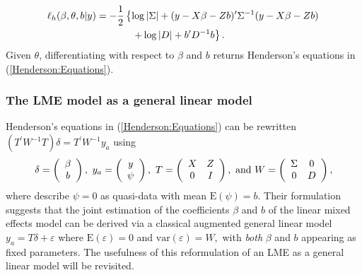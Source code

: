 \documentclass[12pt, a4paper]{report}
\theoremstyle{definition}
\theoremstyle{remark}
\begin{document}
\begin{eqnarray*}
\ell_h(\beta,\theta,b|y)
& = \displaystyle -\frac{1}{2} \left\{ \log|\Sigma| + (y - X \beta -Zb)'\Sigma^{-1}( y - X \beta -Zb) \right.\\
&  \hspace{0.5in} \left. + \log|D| + b^\prime D^{-1}b \right\}.
\end{eqnarray*}
Given $\theta$, differentiating with respect to $\beta$ and $b$ returns Henderson's equations in (\ref{Henderson:Equations}).

\subsubsection{The LME model as a general linear model}
Henderson's equations in (\ref{Henderson:Equations}) can be rewritten $( T^\prime W^{-1} T ) \delta = T^\prime W^{-1} y_{a} $ using
\[
\delta = \left(\begin{array}{c}\beta \\ b \end{array}\right),
\ y_{a} = \left(\begin{array}{c}
y \cr \psi
\end{array}\right),
\ T = \left(\begin{array}{cc}
X & Z  \\
0 & I
\end{array}\right),
\ \textrm{and} \ W = \left(\begin{array}{cc}
\Sigma & 0  \cr
0 &  D \end{array}\right),
\]
where \cite{YLee} describe $\psi = 0$ as quasi-data with mean $\mathrm{E}(\psi) = b.$ Their formulation suggests that the joint estimation of the coefficients $\beta$ and $b$ of the linear mixed effects model can be derived via a classical augmented general linear model $y_{a} = T\delta + \varepsilon$ where $\mathrm{E}(\varepsilon) = 0$ and $\mathrm{var}(\varepsilon) = W,$ with \emph{both} $\beta$ and $b$ appearing as fixed parameters. The usefulness of this reformulation of an LME as a general linear model will be revisited.


%
\end{document}

